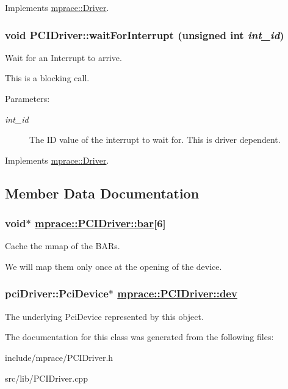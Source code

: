 Implements \hyperlink{classmprace_1_1Driver_a4}{mprace::Driver}.\hypertarget{classmprace_1_1PCIDriver_a9}{
\subsubsection[waitForInterrupt]{\setlength{\rightskip}{0pt plus 5cm}void PCIDriver::wait\-For\-Interrupt (unsigned int {\em int\_\-id})}}
\label{classmprace_1_1PCIDriver_a9}


Wait for an Interrupt to arrive. 

This is a blocking call. \begin{Desc}
\item[Parameters:]
\begin{description}
\item[{\em int\_\-id}]The ID value of the interrupt to wait for. This is driver dependent.\end{description}
\end{Desc}


Implements \hyperlink{classmprace_1_1Driver_a6}{mprace::Driver}.

\subsection{Member Data Documentation}
\hypertarget{classmprace_1_1PCIDriver_p1}{
\subsubsection[bar]{\setlength{\rightskip}{0pt plus 5cm}void$\ast$ \hyperlink{classmprace_1_1PCIDriver_p1}{mprace::PCIDriver::bar}\mbox{[}6\mbox{]}}}
\label{classmprace_1_1PCIDriver_p1}


Cache the mmap of the BARs. 

We will map them only once at the opening of the device.\hypertarget{classmprace_1_1PCIDriver_p0}{
\subsubsection[dev]{\setlength{\rightskip}{0pt plus 5cm}pci\-Driver::Pci\-Device$\ast$ \hyperlink{classmprace_1_1PCIDriver_p0}{mprace::PCIDriver::dev}}}
\label{classmprace_1_1PCIDriver_p0}


The underlying Pci\-Device represented by this object. 



The documentation for this class was generated from the following files:\begin{CompactItemize}
\item 
include/mprace/PCIDriver.h\item 
src/lib/PCIDriver.cpp\end{CompactItemize}
